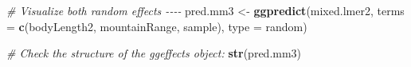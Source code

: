 \documentclass[
]{article}
\newenvironment{Shaded}{\begin{snugshade}}{\end{snugshade}}
\newcommand{\AttributeTok}[1]{\textcolor[rgb]{0.13,0.29,0.53}{#1}}
\newcommand{\CommentTok}[1]{\textcolor[rgb]{0.56,0.35,0.01}{\textit{#1}}}
\newcommand{\FunctionTok}[1]{\textcolor[rgb]{0.13,0.29,0.53}{\textbf{#1}}}
\newcommand{\NormalTok}[1]{#1}
\newcommand{\OtherTok}[1]{\textcolor[rgb]{0.56,0.35,0.01}{#1}}
\newcommand{\StringTok}[1]{\textcolor[rgb]{0.31,0.60,0.02}{#1}}
\begin{document}
\begin{Shaded}
\begin{Highlighting}[]
\CommentTok{\# Visualize both random effects {-}{-}{-}{-}}
\NormalTok{pred.mm3 }\OtherTok{\textless{}{-}} \FunctionTok{ggpredict}\NormalTok{(mixed.lmer2, }\AttributeTok{terms =} \FunctionTok{c}\NormalTok{(}\StringTok{\textquotesingle{}bodyLength2\textquotesingle{}}\NormalTok{, }\StringTok{\textquotesingle{}mountainRange\textquotesingle{}}\NormalTok{, }\StringTok{\textquotesingle{}sample\textquotesingle{}}\NormalTok{), }\AttributeTok{type =} \StringTok{\textquotesingle{}random\textquotesingle{}}\NormalTok{)}

\CommentTok{\# Check the structure of the ggeffects object:}
\FunctionTok{str}\NormalTok{(pred.mm3)}
\end{Highlighting}
\end{Shaded}
\end{document}
